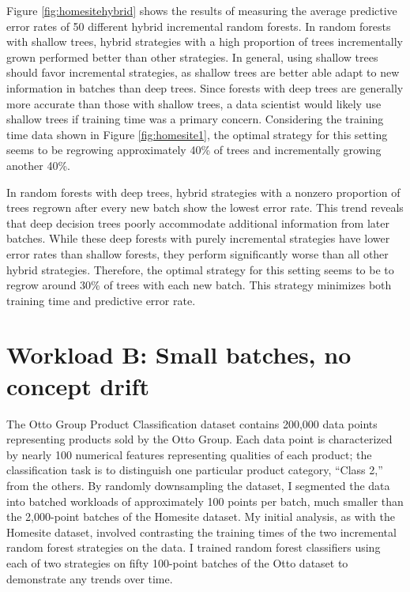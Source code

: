 Figure \ref{fig:homesitehybrid} shows the results of measuring the average
predictive error rates of 50 different hybrid incremental random forests. In
random forests with shallow trees, hybrid strategies with a high proportion of
trees incrementally grown performed better than other strategies. In general,
using shallow trees should favor incremental strategies, as shallow trees are
better able adapt to new information in batches than deep trees.  Since forests
with deep trees are generally more accurate than those with shallow trees, a
data scientist would likely use shallow trees if training time was a primary
concern. Considering the training time data shown in Figure
\ref{fig:homesite1}, the optimal strategy for this setting seems to be
regrowing approximately 40\% of trees and incrementally growing another 40\%. 

In random forests with deep trees, hybrid strategies with a nonzero proportion
of trees regrown after every new batch show the lowest error rate. This trend
reveals that deep decision trees poorly accommodate additional information from
later batches. While these deep forests with purely incremental strategies have
lower error rates than shallow forests, they perform significantly worse than
all other hybrid strategies. Therefore, the optimal strategy for this setting
seems to be to regrow around 30\% of trees with each new batch. This strategy
minimizes both training time and predictive error rate.

\section{Workload B: Small batches, no concept drift}

The Otto Group Product Classification dataset contains 200,000 data points
representing products sold by the Otto Group. Each data point is characterized
by nearly 100 numerical features representing qualities of each product; the
classification task is to distinguish one particular product category, ``Class
2,'' from the others. By randomly downsampling the dataset, I segmented the
data into batched workloads of approximately 100 points per batch, much smaller
than the 2,000-point batches of the Homesite dataset. \cite{Otto} My initial
analysis, as with the Homesite dataset, involved contrasting the training times
of the two incremental random forest strategies on the data. I trained random
forest classifiers using each of two strategies on fifty 100-point batches of
the Otto dataset to demonstrate any trends over time.

